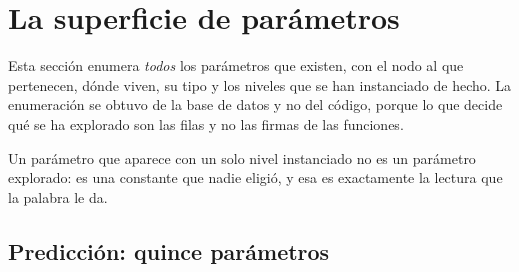 \section{La superficie de parámetros}
\label{sec:parametros}

Esta sección enumera \emph{todos} los parámetros que existen, con el nodo al que
pertenecen, dónde viven, su tipo y los niveles que se han instanciado de hecho. La
enumeración se obtuvo de la base de datos y no del código, porque lo que decide
qué se ha explorado son las filas y no las firmas de las funciones.

Un parámetro que aparece con un solo nivel instanciado no es un parámetro
explorado: es una constante que nadie eligió, y esa es exactamente la lectura que
la palabra  le da.

\subsection{Predicción: quince parámetros}

